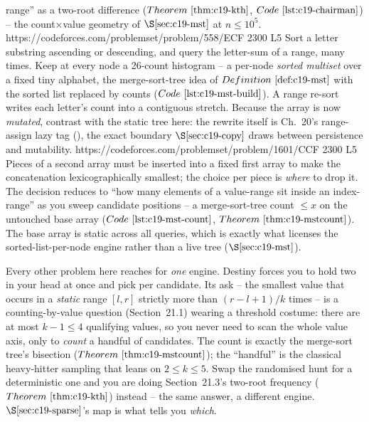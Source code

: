 \begin{mixedset}
{     range'' as a two-root difference (\(\thmref{c19-kth}\), \(\coderef{c19-chairman}\)) -- the
     count\(\times\)value geometry of \(\secref{c19-mst}\) at \(n\le10^5\).}
    {https://codeforces.com/problemset/problem/558/E}{CF 2300 L5}
    {Sort a letter substring ascending or descending, and query the letter-sum of a range, many
     times. Keep at every node a 26-count histogram -- a per-node \emph{sorted multiset} over a
     fixed tiny alphabet, the merge-sort-tree idea of \(\defref{c19-mst}\) with the sorted list
     replaced by counts (\(\coderef{c19-mst-build}\)). A range re-sort writes each letter's count
     into a contiguous stretch. Because the array is now \emph{mutated}, contrast with the static
     tree here: the rewrite itself is Ch.~20's range-assign lazy tag (), the exact
     boundary \(\secref{c19-copy}\) draws between persistence and mutability.}
    {https://codeforces.com/problemset/problem/1601/C}{CF 2300 L5}
    {Pieces of a second array must be inserted into a fixed first array to make the
     concatenation lexicographically smallest; the choice per piece is \emph{where} to drop it.
     The decision reduces to ``how many elements of a value-range sit inside an index-range'' as
     you sweep candidate positions -- a merge-sort-tree count \(\le x\) on the untouched base
     array (\(\coderef{c19-mst-count}\), \(\thmref{c19-mstcount}\)). The base array is static
     across all queries, which is exactly what licenses the sorted-list-per-node engine rather
     than a live tree (\(\secref{c19-mst}\)).}
\end{mixedset}



\begin{notebox}
Every other problem here reaches for \emph{one} engine. Destiny forces you to hold two in
your head at once and pick per candidate. Its ask -- the smallest value that occurs in a
\emph{static} range \([l,r]\) strictly more than \((r-l+1)/k\) times -- is a counting-by-value
question (Section~21.1) wearing a threshold costume: there are at most \(k-1\le4\) qualifying
values, so you never need to scan the whole value axis, only to \emph{count} a handful of
candidates. The count is exactly the merge-sort tree's bisection (\(\thmref{c19-mstcount}\));
the ``handful'' is the classical heavy-hitter sampling that leans on \(2\le k\le5\). Swap the
randomised hunt for a deterministic one and you are doing Section~21.3's two-root frequency
(\(\thmref{c19-kth}\)) instead -- the same answer, a different engine. \(\secref{c19-sparse}\)'s
map is what tells you \emph{which}.
\end{notebox}

